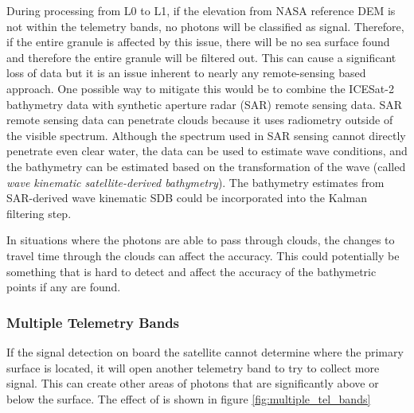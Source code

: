 During processing from L0 to L1, if the elevation from NASA reference DEM is not within the telemetry bands, no photons will be classified as signal. Therefore, if the entire granule is affected by this issue, there will be no sea surface found and therefore the entire granule will be filtered out. This can cause a significant loss of data but it is an issue inherent to nearly any remote-sensing based approach. One possible way to mitigate this would be to combine the ICESat-2 bathymetry data with synthetic aperture radar (SAR) remote sensing data. SAR remote sensing data can penetrate clouds because it uses radiometry outside of the visible spectrum. Although the spectrum used in SAR sensing cannot directly penetrate even clear water, the data can be used to estimate wave conditions, and the bathymetry can be estimated based on the transformation of the wave (called \emph{wave kinematic satellite-derived bathymetry}). The bathymetry estimates from SAR-derived wave kinematic SDB could be incorporated into the Kalman filtering step. 

In situations where the photons are able to pass through clouds, the changes to travel time through the clouds can affect the accuracy. This could potentially be something that is hard to detect and affect the accuracy of the bathymetric points if any are found.
 

\subsubsection{Multiple Telemetry Bands}

If the signal detection on board the satellite cannot determine where the primary surface is located, it will open another telemetry band to try to collect more signal. This can create other areas of photons that are significantly above or below the surface. The effect of is shown in figure \ref{fig:multiple_tel_bands}

